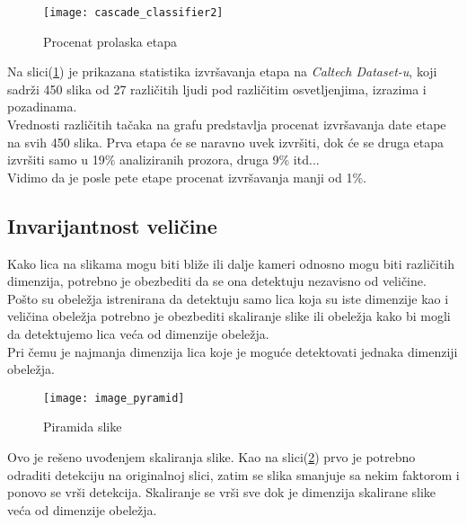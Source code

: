 \newpage

\begin{figure}[h]
  \centering
  \texttt{[image: cascade\_classifier2]}
  \caption{Procenat prolaska etapa}
  \label{cascade_classifier_img2}
\end{figure}

Na slici(\ref{cascade_classifier_img2}) je prikazana statistika izvršavanja
etapa na \emph{Caltech Dataset-u}\cite{CALTECH_DATASET}, koji sadrži 450 slika
od 27 različitih ljudi pod različitim osvetljenjima, izrazima i pozadinama. \\

Vrednosti različitih tačaka na grafu predstavlja procenat izvršavanja date etape
na svih 450 slika. Prva etapa će se naravno uvek izvršiti, dok će se druga etapa
izvršiti samo u 19\% analiziranih prozora, druga 9\% itd... \\
Vidimo da je posle pete etape procenat izvršavanja manji od 1\%. \\

\newpage

\subsection{Invarijantnost veličine}\label{image_scaling}

Kako lica na slikama mogu biti bliže ili dalje kameri odnosno mogu biti
različitih dimenzija, potrebno je obezbediti da se ona detektuju nezavisno od
veličine. \\

Pošto su obeležja istrenirana da detektuju samo lica koja su iste dimenzije kao
i veličina obeležja potrebno je obezbediti skaliranje slike ili obeležja kako bi
mogli da detektujemo lica veća od dimenzije obeležja. \\
Pri čemu je najmanja dimenzija lica koje je moguće detektovati jednaka dimenziji obeležja.

\begin{figure}[h]
  \centering
  \texttt{[image: image\_pyramid]}
  \caption{Piramida slike\cite{ImagePyramid_web}}
  \label{image_pyramid}
\end{figure}

Ovo je rešeno uvođenjem skaliranja slike. Kao na slici(\ref{image_pyramid}) prvo
je potrebno odraditi detekciju na originalnoj slici, zatim se slika smanjuje sa
nekim faktorom i ponovo se vrši detekcija.
Skaliranje se vrši sve dok je dimenzija skalirane slike veća od dimenzije obeležja.

